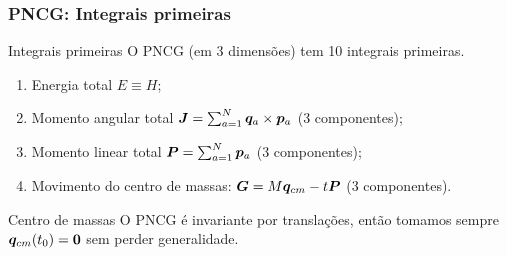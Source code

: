 
\begin{frame}
\justifying
\frametitle{PNCG: Integrais primeiras}

\begin{block}{Integrais primeiras}
    O PNCG (em 3 dimensões) tem 10 integrais primeiras.
    \begin{enumerate}
        \item Energia total $E \equiv H$;
        \item Momento angular total $\bm J = \sum_{a=1}^N \bm q_a \times \bm p_a$ (3 componentes);
        \item Momento linear total $\bm P = \sum_{a=1}^N \bm p_a$ (3 componentes);
        \item Movimento do centro de massas: $\bm G = M \bm q_{cm} - t \bm P$ (3 componentes).
    \end{enumerate}
\end{block}
\begin{block}{Centro de massas}
    O PNCG é invariante por translações, então tomamos sempre $\bm q_{cm}(t_0) = \bm 0$ sem perder generalidade.
\end{block}

\end{frame}

